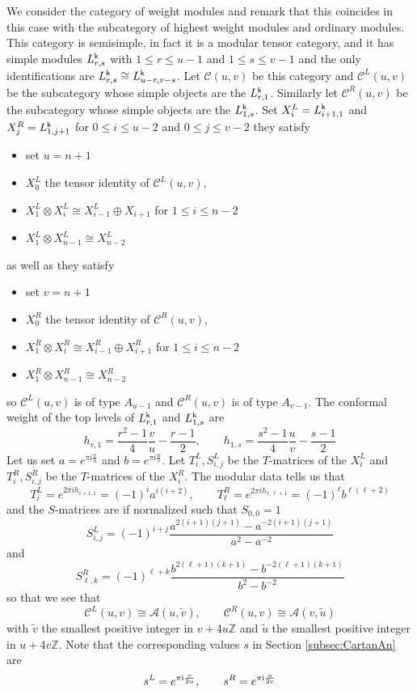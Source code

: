 \documentclass[a4paper, reqno]{amsart}
\theoremstyle{introTheorems}
\def\ZZ{\mathbb{Z}}
\newcommand\cA{\mathcal{A}}
\newcommand\cC{\mathcal{C}}
\renewcommand{\1}{\mathbbold{1}}
\begin{document}
We consider the category of weight modules and remark that this coincides in this case with the subcategory of highest weight modules and ordinary modules. This category is semisimple, in fact it is a modular tensor category, and it has simple modules $L^{\mathsf{k}}_{r, s}$ with $1 \leq  r \leq  u-1$ and $1 \leq s \leq v-1$ and the only identifications are $L^{\mathsf{k}}_{r, s} \cong L^{\mathsf{k}}_{u-r, v-s}$. 
Let $\mathcal C(u, v)$ be this category and $\mathcal C^L(u, v)$ be the subcategory whose simple objects are the $L^{\mathsf{k}}_{r, 1}$. Similarly let $\cC^R(u, v)$ be the subcategory whose simple objects are the $L^{\mathsf{k}}_{1, s}$. 
Set $X_i^L = L^{\mathsf{k}}_{i+1, 1}$ and $X_j^R = L^{\mathsf{k}}_{1, j +1}$ for $0 \leq  i \leq u-2$ and $ 0 \leq  j \leq v-2$
they satisfy
\begin{itemize}
\item set $u = n+1$
    \item  $X_0^L$ the tensor identity of $\mathcal C^L(u, v)$,
    \item $X_1^L \otimes X_i^L \cong X_{i-1}^L \oplus X_{i+1}$ for $1 \leq  i  \leq n-2$
    \item $X_1^L \otimes X_{n-1}^L \cong X_{n-2}^L$
\end{itemize}
as well as
they satisfy
\begin{itemize}
\item set $v = n+1$
    \item  $X_0^R$ the tensor identity of $\mathcal C^R(u, v)$,
    \item $X_1^R \otimes X_i^R \cong X_{i-1}^R \oplus X_{i+1}^R$ for $1 \leq  i  \leq n-2$
    \item $X_1^R \otimes X_{n-1}^R \cong X_{n-2}^R$
\end{itemize}
so $\mathcal C^L(u, v)$ is of type $A_{u-1}$ and $\mathcal C^R(u, v)$ is of type $A_{v-1}$. 
The conformal weight of the top levels of $L^{\mathsf{k}}_{r, 1}$ and $L^{\mathsf{k}}_{1, s}$ are
\[
h_{r, 1} = \frac{r^2-1}{4}\frac{v}{u} - \frac{r-1}{2}, \qquad 
h_{1, s} = \frac{s^2-1}{4}\frac{u}{v} - \frac{s-1}{2}
\]
Let us set $a = e^{\pi i \frac{v}{u}}$ and $b = e^{\pi i \frac{u}{v}}$. Let $T^L_i, S^L_{i, j}$ be the $T$-matrices of the $X_i^L$ and $T^R_i, S^R_{i, j}$ be the $T$-matrices of the $X_i^R$. The modular data tells us that
\[
T_i^L = e^{2\pi i h_{i+1, 1}} = (-1)^i a^{i(i+2)}, \qquad T_\ell^R = e^{2\pi i h_{1, \ell + 1}} = (-1)^\ell b^{\ell(\ell+2)}
\]
and the $S$-matrices are if normalized such that $S_{0, 0} =1$
\[
S^L_{i, j} =  (-1)^{i+j} \frac{a^{2(i+1)(j+1)}- a^{-2(i+1)(j+1)}}{a^2-a^{-2}}
\]
and
\[
S^R_{\ell, k} =  (-1)^{\ell + k} \frac{b^{2(\ell+1)(k+1)} - b^{-2(\ell+1)(k+1)}}{b^2-b^{-2}}
\]
so that we see that
\[
\cC^L(u, v) \cong \cA(u, \tilde v), \qquad \cC^R(u, v) \cong \cA(v, \tilde u)
\]
with $\tilde v$ the smallest positive integer in $v + 4u \ZZ$ and $\tilde u $ the smallest positive integer in $u + 4v \ZZ$. Note that the corresponding values $s$ in Section \ref{subsec:CartanAn} are 
\[
s^L=e^{\pi\mathrm{i}\frac{v}{2u}},\qquad 
s^R=e^{\pi\mathrm{i}\frac{u}{2v}}
\]
\end{document}
